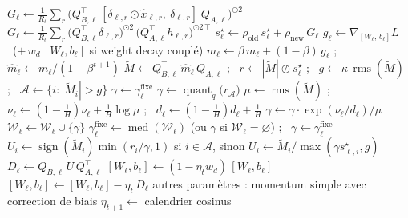 \documentclass[11pt,a4paper]{article}
\newcommand{\Mt}{\widetilde{M}}
\newcommand{\hb}{\bar h}
\newcommand{\mh}{\hat m}
\DeclareMathOperator{\sign}{sign}
\DeclareMathOperator{\rms}{rms}
\DeclareMathOperator{\med}{med}
\begin{document}
\begin{algorithm}[H]
\begin{algorithmic}[1]
      \State $G_\ell \gets \tfrac1{R_\ell}\sum_r \bigl(Q_{B,\ell}^\top\,
             [\delta_{\ell,r}\odot\hat x_{\ell,r},\ \delta_{\ell,r}]\;Q_{A,\ell}\bigr)^{\odot 2}$
    \Else
      \State $G_\ell \gets \tfrac1{R_\ell}\sum_r \bigl(Q_{B,\ell}^\top \delta_{\ell,r}\bigr)^{\odot 2}\,
             \bigl(Q_{A,\ell}^\top \hb_{\ell,r}\bigr)^{\odot 2\,\top}$ 
    \EndIf
    \State $s^\star_\ell \gets \rho_\text{old}\,s^\star_\ell + \rho_\text{new}\,G_\ell$
  \EndIf
    \State $g_\ell \gets \nabla_{[W_\ell,\,b_\ell]} L$ \ ($+\,w_d\,[W_\ell, b_\ell]$ si weight decay couplé)
    \State $m_\ell \gets \beta\, m_\ell + (1-\beta)\, g_\ell$ ; \ $\mh_\ell \gets m_\ell / (1-\beta^{t+1})$
    \State $\Mt \gets Q_{B,\ell}^\top\, \mh_\ell\, Q_{A,\ell}$ ; \ $r \gets |\Mt| \oslash s^\star_\ell$ ;
           \ $g \gets \kappa\,\rms(\Mt)$ ; \ $\mathcal A \gets \{i : |\Mt_i| > g\}$
      \State $\gamma \gets \gamma^\text{fixe}_\ell$
    \Else
      \State $\gamma \gets \operatorname{quant}_q\bigl(r_{\mathcal A}\bigr)$
      \If{règle $=$ ema \textbf{et} $\rms(\Mt) > 0$}
        \State $\mu \gets \rms(\Mt)$ ; \ $\nu_\ell \gets (1-\tfrac1H)\nu_\ell + \tfrac1H\log\mu$ ;
               \ $d_\ell \gets (1-\tfrac1H)d_\ell + \tfrac1H$
        \State $\gamma \gets \gamma\cdot\exp(\nu_\ell/d_\ell)/\mu$
      \EndIf
       $\mathcal W_\ell \gets \mathcal W_\ell \cup \{\gamma\}$ \EndIf
        \State $\gamma^\text{fixe}_\ell \gets \med(\mathcal W_\ell)$ (ou $\gamma$ si $\mathcal W_\ell = \varnothing$) ;
               \ $\gamma \gets \gamma^\text{fixe}_\ell$ 
      \EndIf
    \EndIf
    \State $U_i \gets \sign(\Mt_i)\min(r_i/\gamma, 1)$ si $i \in \mathcal A$, sinon
           $U_i \gets \Mt_i/\max(\gamma s^\star_{\ell,i}, g)$ 
    \State $D_\ell \gets Q_{B,\ell}\, U\, Q_{A,\ell}^\top$
     $[W_\ell, b_\ell] \gets (1-\eta_t w_d)\,[W_\ell, b_\ell]$ \EndIf
    \State $[W_\ell, b_\ell] \gets [W_\ell, b_\ell] - \eta_t\, D_\ell$ 
  \EndFor
  \State autres paramètres : momentum simple avec correction de biais 
  \State $\eta_{t+1} \gets$ calendrier cosinus
\EndFor
\end{algorithmic}
\end{algorithm}
\end{document}
